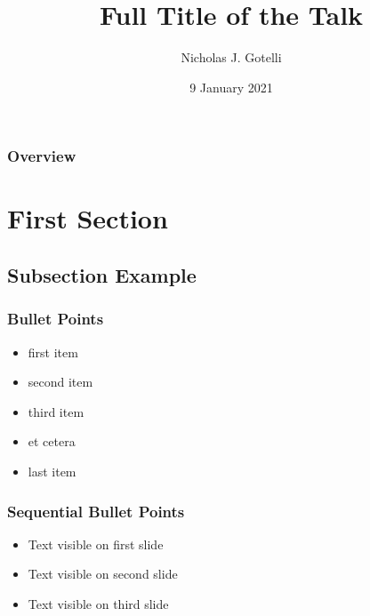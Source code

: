 \documentclass[12pt]{beamer}\usepackage[]{graphicx}\usepackage[]{color}
\title[Short title]{Full Title of the Talk} %
\author{Nicholas J. Gotelli} %
\institute[UVM] %
{
University of Vermont \\ %
Department of Biology \\
Burlington, VT 05401 USA \\ 
\medskip
\textit{ngotelli@uvm.edu} %
}
\date{9 January 2021} %
\begin{document}
\begin{frame}
\titlepage %
\end{frame}


\begin{frame}
\frametitle{Overview} %
\tableofcontents %
\end{frame}

\section{First Section} %

\subsection{Subsection Example} %

\begin{frame}
\frametitle{Bullet Points}
\begin{itemize}
\item first item
\item second item
\item third item
\item et cetera
\item last item
\end{itemize}
\end{frame}

\begin{frame}
\frametitle{Sequential Bullet Points}
\begin{itemize}
\item<1-> Text visible on first slide
\item<2-> Text visible on second slide
\item<3-> Text visible on third slide
\end{itemize}
\end{frame}
\end{document}
